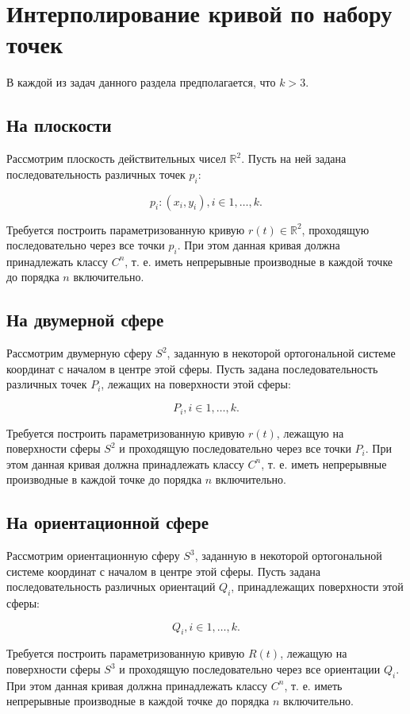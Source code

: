 \section{Интерполирование кривой по набору точек}

В каждой из задач данного раздела предполагается, что $k>3$.

\subsection*{На плоскости}

Рассмотрим плоскость действительных чисел $\mathbb{R}^2$. Пусть на ней задана последовательность различных точек $p_i$:

$${p_i: (x_i, y_i)}, i \in {1, \dots, k}.$$

Требуется построить параметризованную кривую $r(t) \in \mathbb{R}^2$, проходящую последовательно через все точки
$p_i$. При этом данная кривая должна принадлежать классу $C^n$, т. е. иметь непрерывные производные в каждой точке до
порядка $n$ включительно.

\subsection*{На двумерной сфере}

Рассмотрим двумерную сферу $S^2$, заданную в некоторой ортогональной системе координат с началом в центре этой сферы.
Пусть задана последовательность различных точек $P_i$, лежащих на поверхности этой сферы:

$${P_i}, i \in {1, \dots, k}.$$

Требуется построить параметризованную кривую $r(t)$, лежащую на поверхности сферы $S^2$ и проходящую последовательно
через все точки $P_i$. При этом данная кривая должна принадлежать классу $C^n$, т. е. иметь непрерывные производные в
каждой точке до порядка $n$ включительно.

\subsection*{На ориентационной сфере}

Рассмотрим ориентационную сферу $S^3$, заданную в некоторой ортогональной сис\-теме координат с началом в центре этой
сферы. Пусть задана последовательность различных ориентаций $Q_i$, принадлежащих поверхности этой сферы:

$${Q_i}, i \in {1, \dots, k}.$$

Требуется построить параметризованную кривую $R(t)$, лежащую на поверхности сферы $S^3$ и проходящую
последовательно через все ориентации $Q_i$. При этом данная кривая должна принадлежать классу $C^n$, т. е. иметь
непрерывные производные в каждой точке до порядка $n$ включительно.
